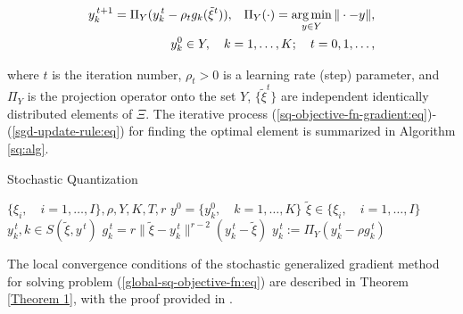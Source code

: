 \begin{eqnarray}
    y^{\,t+1}_k = \Pi_{Y} (y^{\,t}_k - \rho_t g_k(\tilde{\xi}^{t})), \;\;\; \Pi_{Y} (\cdot) = \operatorname*{arg\,min}_{y \in Y} \| \cdot - y\|, \label{sgd-update-rule:eq} \\
    y^{0}_k \in Y, \quad k=1,\ldots,K;\quad t=0,1,\ldots, \label{sgd-update-rule2:eq}
\end{eqnarray}

\noindent where $t$ is the iteration number, $\rho_t > 0$ is a learning rate (step) parameter, and $\Pi_{Y}$ is the projection operator onto the set $Y$, $\{\tilde{\xi}^{t}\}$ are independent identically distributed elements of $\Xi$. The iterative process (\ref{sq-objective-fn-gradient:eq})-(\ref{sgd-update-rule:eq}) for finding the optimal element is summarized in Algorithm \ref{sq:alg}.

\begin{algorithm}
    \caption{Stochastic Quantization}\label{sq:alg}
    \begin{algorithmic}[1]
    \Require $ \{ \xi_i, \quad i = 1, \ldots, I \}, \rho, Y, K, T, r $
    \State $ y^{0} = \{ y_k^{0}, \quad k = 1, \ldots, K \} $ 
        \State $ \tilde{\xi} \in \{ \xi_i, \quad i = 1, \ldots, I \} $ 
        \State $ y_k^{\,t}, k \in S(\tilde{\xi}, y^{\,t}) $ 
        \State $ g_k^{\,t} = r \| \tilde{\xi} - y_k^{\,t} \|^{r - 2} (y_k^{\,t} - \tilde{\xi}) $ 
        \State $ y_k^{\,t} := \Pi_Y (y_k^{\,t} - \rho g_k^{\,t}) $ 
    \EndFor
    \end{algorithmic}
\end{algorithm}

The local convergence conditions of the stochastic generalized gradient method for solving problem (\ref{global-sq-objective-fn:eq}) are described in Theorem \ref{Theorem 1}, with the proof provided in \cite{Ermoliev_Norkin_2003,Ermolev_Norkin_1998}.

